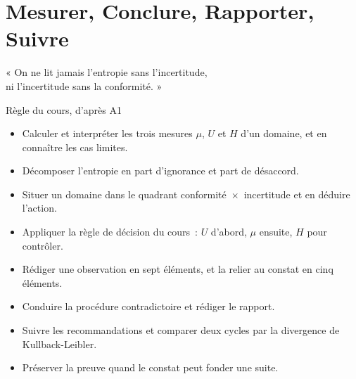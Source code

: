 
\chapter[Mesurer, conclure, rapporter, suivre]{Mesurer, Conclure, Rapporter, Suivre}
\label{chap:constater}

\epigraph{%
    « On ne lit jamais l'entropie sans l'incertitude,\\
    ni l'incertitude sans la conformité. »%
}{Règle du cours, d'après A1}


\begin{boxobjectifs}
\begin{itemize}
    \item Calculer et interpréter les trois mesures $\mu$, $U$ et $H$ d'un
          domaine, et en connaître les cas limites.
    \item Décomposer l'entropie en part d'ignorance et part de désaccord.
    \item Situer un domaine dans le quadrant conformité~$\times$~incertitude
          et en déduire l'action.
    \item Appliquer la règle de décision du cours~: $U$ d'abord, $\mu$
          ensuite, $H$ pour contrôler.
    \item Rédiger une observation en sept éléments, et la relier au constat
          en cinq éléments.
    \item Conduire la procédure contradictoire et rédiger le rapport.
    \item Suivre les recommandations et comparer deux cycles par la
          divergence de Kullback-Leibler.
    \item Préserver la preuve quand le constat peut fonder une suite.
\end{itemize}
\end{boxobjectifs}

